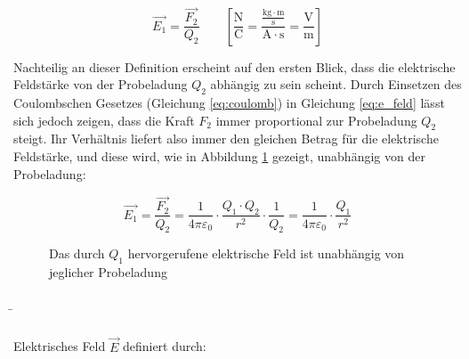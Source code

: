 \begin{frame}
{	\begin{equation}
		\vec{E_1} = \frac{\vec{F_2}}{Q_2}  \quad \quad \left[ \frac{\mathrm{N}}{\mathrm{C}} =  \frac{\frac{\mathrm{kg \cdot m}}{\mathrm{s}}}{\mathrm{A \cdot s}} = \frac{\mathrm{V}}{\mathrm{m}} \right]
		\label{eq:e_feld}
	\end{equation}


	Nachteilig an dieser Definition erscheint auf den ersten Blick, dass die elektrische Feldstärke von der
	Probeladung $Q_2$ abhängig zu sein scheint. 
	Durch Einsetzen des Coulombschen Gesetzes (Gleichung \ref{eq:coulomb}) in Gleichung \ref{eq:e_feld} lässt sich jedoch zeigen, 
	dass die Kraft $F_2$ immer proportional zur Probeladung $Q_2$ steigt. Ihr Verhältnis liefert also immer den
	gleichen Betrag für die elektrische Feldstärke, und diese wird, wie in Abbildung \ref{fig:efeld1} gezeigt, unabhängig von der Probeladung:


	\begin{equation}
		\vec{E_1} = \frac{\vec{F_2}}{Q_2} =\frac{1}{4 \pi \varepsilon_0} \cdot \frac{Q_1 \cdot Q_2}{r^2} \cdot \frac{1}{Q_2} = \frac{1}{4 \pi \varepsilon_0} \cdot \frac{Q_1}{r^2}
		\label{e_feld2}
	\end{equation}


	\begin{figure}[ht]
		\centering
		\caption{Das durch $Q_1$ hervorgerufene elektrische Feld ist unabhängig von jeglicher Probeladung}
		\label{fig:efeld1}
	\end{figure}
	

	}


	\b{

	\begin{columns}


		Elektrisches Feld $\vec{E}$ definiert durch:\\
		\vspace{5pt}


\end{columns}}
\end{frame}
